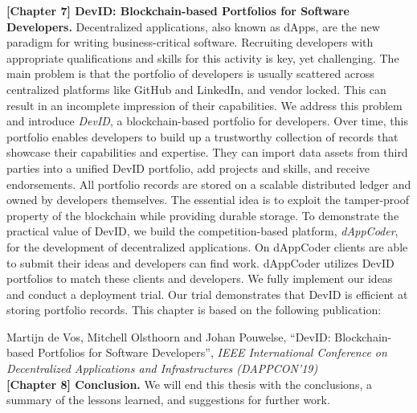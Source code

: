 \textbf{[Chapter 7] DevID: Blockchain-based Portfolios for Software Developers.}
Decentralized applications, also known as dApps, are the new paradigm for writing business-critical software.
Recruiting developers with appropriate qualifications and skills for this activity is key, yet challenging.
The main problem is that the portfolio of developers is usually scattered across centralized platforms like GitHub and LinkedIn, and vendor locked.
This can result in an incomplete impression of their capabilities.
We address this problem and introduce \emph{DevID}, a blockchain-based portfolio for developers.
Over time, this portfolio enables developers to build up a trustworthy collection of records that showcase their capabilities and expertise.
They can import data assets from third parties into a unified DevID portfolio, add projects and skills, and receive endorsements.
All portfolio records are stored on a scalable distributed ledger and owned by developers themselves.
The essential idea is to exploit the tamper-proof property of the blockchain while providing durable storage.
To demonstrate the practical value of DevID, we build the competition-based platform, \emph{dAppCoder}, for the development of decentralized applications.
On dAppCoder clients are able to submit their ideas and developers can find work.
dAppCoder utilizes DevID portfolios to match these clients and developers.
We fully implement our ideas and conduct a deployment trial.
Our trial demonstrates that DevID is efficient at storing portfolio records.
This chapter is based on the following publication:

Martijn de Vos, Mitchell Olsthoorn and Johan Pouwelse, \enquote{DevID: Blockchain-based Portfolios for Software Developers}, \emph{IEEE International Conference on Decentralized Applications and Infrastructures (DAPPCON'19)}\\

\textbf{[Chapter 8] Conclusion.} We will end this thesis with the conclusions, a summary of the lessons learned, and suggestions for further work.

\newpage


